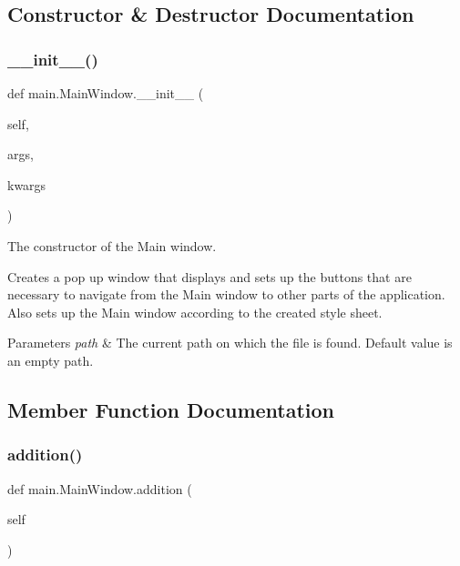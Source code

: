 \subsection{Constructor \& Destructor Documentation}
\mbox{\label{classmain_1_1_main_window_aafffd1d8e8955b1e04e531ad7f534b69}} 
\subsubsection{\texorpdfstring{\+\_\+\+\_\+init\+\_\+\+\_\+()}{\_\_init\_\_()}}
{\footnotesize\ttfamily def main.\+Main\+Window.\+\_\+\+\_\+init\+\_\+\+\_\+ (\begin{DoxyParamCaption}\item[{}]{self,  }\item[{}]{args,  }\item[{}]{kwargs }\end{DoxyParamCaption})}



The constructor of the Main window. 

Creates a pop up window that displays and sets up the buttons that are necessary to navigate from the Main window to other parts of the application. Also sets up the Main window according to the created style sheet. 
\begin{DoxyParams}{Parameters}
{\em path} & The current path on which the file is found. Default value is an empty path. \\
\hline
\end{DoxyParams}


\subsection{Member Function Documentation}
\mbox{\label{classmain_1_1_main_window_ad3673a13020c18149857ca57cbd13303}} 
\subsubsection{\texorpdfstring{addition()}{addition()}}
{\footnotesize\ttfamily def main.\+Main\+Window.\+addition (\begin{DoxyParamCaption}\item[{}]{self }\end{DoxyParamCaption})}



